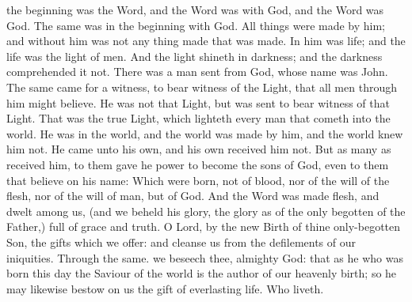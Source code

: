  the beginning was the Word, and the Word was with God, and the Word was God. The same was in the beginning with God. All things were made by him; and without him was not any thing made that was made. In him was life; and the life was the light of men. And the light shineth in darkness; and the darkness comprehended it not. There was a man sent from God, whose name was John. The same came for a witness, to bear witness of the Light, that all men through him might believe. He was not that Light, but was sent to bear witness of that Light. That was the true Light, which lighteth every man that cometh into the world. He was in the world, and the world was made by him, and the world knew him not. He came unto his own, and his own received him not. But as many as received him, to them gave he power to become the sons of God, even to them that believe on his name: Which were born, not of blood, nor of the will of the flesh, nor of the will of man, but of God.  And the Word was made flesh, and dwelt among us, (and we beheld his glory, the glory as of the only begotten of the Father,) full of grace and truth.
\secret
{} O Lord, by the new Birth of thine only-begotten Son, the gifts which we offer: and cleanse us from the defilements of our iniquities. Through the same.
\postcommunion
{} we beseech thee, almighty God: that as he who was born this day the Saviour of the world is the author of our heavenly birth; so he may likewise bestow on us the gift of everlasting life. Who liveth.

